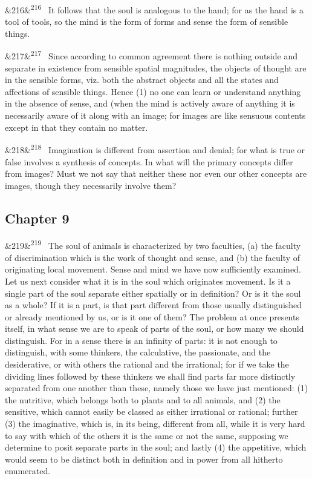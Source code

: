 \documentclass[12pt]{article}
\newcommand{\para}[1][]{\par\noindent\ifx&#1&\else\textsuperscript{\footnotesize #1}~\fi}
\begin{document}
\para[216] It follows that the soul is analogous to the hand; for as the hand is a tool of tools, so the mind is the form of forms and sense the form of sensible things.

\para[217] Since according to common agreement there is nothing outside and separate in existence from sensible spatial magnitudes, the objects of thought are in the sensible forms, viz. both the abstract objects and all the states and affections of sensible things. Hence (1) no one can learn or understand anything in the absence of sense, and (when the mind is actively aware of anything it is necessarily aware of it along with an image; for images are like sensuous contents except in that they contain no matter.

\para[218] Imagination is different from assertion and denial; for what is true or false involves a synthesis of concepts. In what will the primary concepts differ from images? Must we not say that neither these nor even our other concepts are images, though they necessarily involve them?

\subsection*{Chapter 9}

\para[219] The soul of animals is characterized by two faculties, (a) the faculty of discrimination which is the work of thought and sense, and (b) the faculty of originating local movement. Sense and mind we have now sufficiently examined. Let us next consider what it is in the soul which originates movement. Is it a single part of the soul separate either spatially or in definition? Or is it the soul as a whole? If it is a part, is that part different from those usually distinguished or already mentioned by us, or is it one of them? The problem at once presents itself, in what sense we are to speak of parts of the soul, or how many we should distinguish. For in a sense there is an infinity of parts: it is not enough to distinguish, with some thinkers, the calculative, the passionate, and the desiderative, or with others the rational and the irrational; for if we take the dividing lines followed by these thinkers we shall find parts far more distinctly separated from one another than these, namely those we have just mentioned: (1) the nutritive, which belongs both to plants and to all animals, and (2) the sensitive, which cannot easily be classed as either irrational or rational; further (3) the imaginative, which is, in its being, different from all, while it is very hard to say with which of the others it is the same or not the same, supposing we determine to posit separate parts in the soul; and lastly (4) the appetitive, which would seem to be distinct both in definition and in power from all hitherto enumerated.
\end{document}
